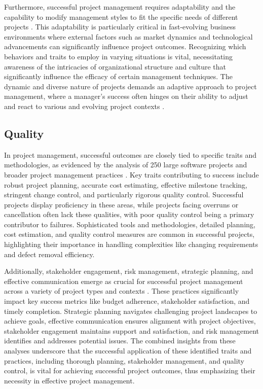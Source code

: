 \documentclass{article}
\begin{document}
Furthermore, successful project management requires adaptability and the capability to modify management styles to fit the specific needs of different projects \cite{markopoulos2005project}. This adaptability is particularly critical in fast-evolving business environments where external factors such as market dynamics and technological advancements can significantly influence project outcomes. Recognizing which behaviors and traits to employ in varying situations is vital, necessitating awareness of the intricacies of organizational structure and culture that significantly influence the efficacy of certain management techniques. The dynamic and diverse nature of projects demands an adaptive approach to project management, where a manager's success often hinges on their ability to adjust and react to various and evolving project contexts \cite{pollack2016project}.

\subsection{Quality}

In project management, successful outcomes are closely tied to specific traits and methodologies, as evidenced by the analysis of 250 large software projects and broader project management practices \cite{jones2004software}. Key traits contributing to success include robust project planning, accurate cost estimating, effective milestone tracking, stringent change control, and particularly rigorous quality control. Successful projects display proficiency in these areas, while projects facing overruns or cancellation often lack these qualities, with poor quality control being a primary contributor to failures. Sophisticated tools and methodologies, detailed planning, cost estimation, and quality control measures are common in successful projects, highlighting their importance in handling complexities like changing requirements and defect removal efficiency.

Additionally, stakeholder engagement, risk management, strategic planning, and effective communication emerge as crucial for successful project management across a variety of project types and contexts \cite{fernandes2013identifying}. These practices significantly impact key success metrics like budget adherence, stakeholder satisfaction, and timely completion. Strategic planning navigates challenging project landscapes to achieve goals, effective communication ensures alignment with project objectives, stakeholder engagement maintains support and satisfaction, and risk management identifies and addresses potential issues. The combined insights from these analyses underscore that the successful application of these identified traits and practices, including thorough planning, stakeholder management, and quality control, is vital for achieving successful project outcomes, thus emphasizing their necessity in effective project management.
\end{document}
